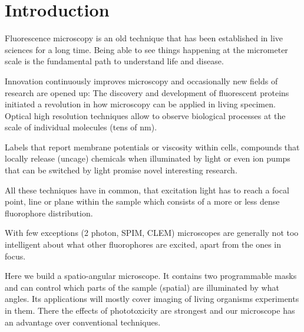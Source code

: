 \chapter{Introduction}
Fluorescence microscopy is an old technique that has been established
in live sciences for a long time. Being able to see things happening
at the micrometer scale is the fundamental path to understand life and
disease.

Innovation continuously improves microscopy and occasionally new
fields of research are opened up: The discovery and development of
fluorescent proteins initiated a revolution in how microscopy can be
applied in living specimen. Optical high resolution techniques allow
to observe biological processes at the scale of individual molecules
(tens of nm). 

Labels that report membrane potentials or viscosity within cells,
compounds that locally release (uncage) chemicals when illuminated by
light or even ion pumps that can be switched by light promise novel
interesting research.

All these techniques have in common, that excitation light has to
reach a focal point, line or plane within the sample which consists of
a more or less dense fluorophore distribution.

With few exceptions (2 photon, SPIM, CLEM) microscopes are generally not too
intelligent about what other fluorophores are excited, apart from the
ones in focus.

Here we build a spatio-angular microscope. It contains two
programmable masks and can control which parts of the sample (spatial)
are illuminated by what angles. Its applications will mostly cover
imaging of living organisms experiments in them. There the effects of
phototoxicity are strongest and our microscope has an advantage over
conventional techniques.
